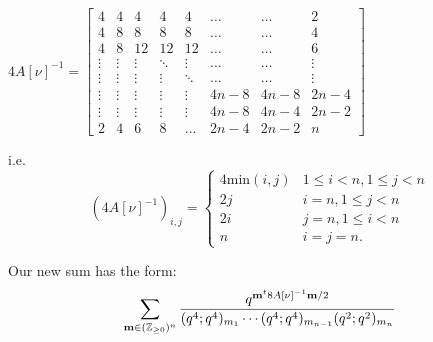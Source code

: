 \documentclass[ALCO,Unicode,published]{cedram}
\begin{document}
\begin{center}
$
4A[\nu]^{-1} = \begin{bmatrix}
    4      & 4     & 4      & 4      & 4      & \ldots & \ldots & 2\\
    4    &  8     & 8     & 8      & 8     & \ldots & \ldots & 4\\
    4      & 8     &  12     & 12     & 12      & \ldots & \ldots & 6\\
    \vdots & \vdots & \vdots & \ddots & \vdots & \ldots & \ldots & \vdots \\
    \vdots & \vdots & \vdots & \vdots & \ddots & \ldots & \ldots & \vdots \\
    \vdots & \vdots & \vdots & \vdots & \vdots & 4n-8     & 4n-8     & 2n-4\\
    \vdots & \vdots & \vdots & \vdots & \vdots & 4n-8     & 4n-4      & 2n-2 \\
  2 & 4 & 6 & 8 & \hdots & 2n-4      & 2n-2    & n 
\end{bmatrix}$\\
\end{center}
i.e. 
\begin{equation}
(4A[\nu]^{-1})_{i,j} = \begin{cases}
4 \text{min}(i,j) & 1 \le i < n, 1 \le j < n \\
2j & i=n, 1 \le j < n\\
2i & j=n, 1 \le i <n\\
n & i=j=n.
\end{cases}
\end{equation}

Our new sum has the form:
\begin{equation}
\sum_{{\bf m} \in (\mathbb{Z}_{\ge 0})^n} \frac{q^{{\bf m}^t 8A[\nu]^{-1} {\bf m}/2}}{(q^4;q^4)_{m_1} \cdots (q^4;q^4)_{m_{n-1}}(q^2; q^2)_{m_n}}
\end{equation}
\end{document}
